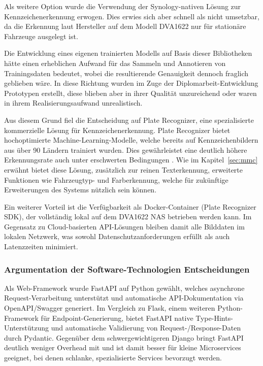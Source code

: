Als weitere Option wurde die Verwendung der Synology-nativen Lösung zur Kennzeichenerkennung erwogen.
Dies erwies sich aber schnell als nicht umsetzbar, da die Erkennung laut Hersteller auf dem Modell DVA1622 nur für stationäre Fahrzeuge ausgelegt ist. \cite{synology_lpr}

Die Entwicklung eines eigenen trainierten Modells auf Basis dieser Bibliotheken hätte einen erheblichen Aufwand für das Sammeln und Annotieren von Trainingsdaten bedeutet, wobei die resultierende Genauigkeit dennoch fraglich geblieben wäre.
In diese Richtung wurden im Zuge der Diplomarbeit-Entwicklung Prototypen erstellt, diese blieben aber in ihrer Qualität unzureichend oder waren in ihrem Realisierungsaufwand unrealistisch.

Aus diesem Grund fiel die Entscheidung auf Plate Recognizer, eine spezialisierte kommerzielle Lösung für Kennzeichenerkennung.
Plate Recognizer bietet hochoptimierte Machine-Learning-Modelle, welche bereits auf Kennzeichenbildern aus über 90 Ländern trainiert wurden. \cite{platerecognizer_countries}
Dies gewährleistet eine deutlich höhere Erkennungsrate auch unter erschwerten Bedingungen \cite{platerecognizer_results}.
Wie im Kapitel~\ref{sec:mmc} erwähnt bietet diese Lösung, zusätzlich zur reinen Texterkennung, erweiterte Funktionen wie Fahrzeugtyp- und Farberkennung, welche für zukünftige Erweiterungen des Systems nützlich sein können.

Ein weiterer Vorteil ist die Verfügbarkeit als Docker-Container (Plate Recognizer SDK), der vollständig lokal auf dem DVA1622 NAS betrieben werden kann.
Im Gegensatz zu Cloud-basierten API-Lösungen bleiben damit alle Bilddaten im lokalen Netzwerk, was sowohl Datenschutzanforderungen erfüllt als auch Latenzzeiten minimiert. \cite{platerecognizer_snapshot}


\subsubsection{Argumentation der Software-Technologien Entscheidungen}

Als Web-Framework wurde FastAPI auf Python gewählt, welches asynchrone Request-Verarbeitung unterstützt und automatische API-Dokumentation via OpenAPI/Swagger generiert. \cite{fastapi}
Im Vergleich zu Flask, einem weiteren Python-Framework für Endpoint-Generierung, bietet FastAPI native Type-Hints-Unterstützung und automatische Validierung von Request-/Response-Daten durch Pydantic. \cite{jetbrains_frameworks}
Gegenüber dem schwergewichtigeren Django bringt FastAPI deutlich weniger Overhead mit und ist damit besser für kleine Microservices geeignet, bei denen schlanke, spezialisierte Services bevorzugt werden. \cite{jetbrains_frameworks}

